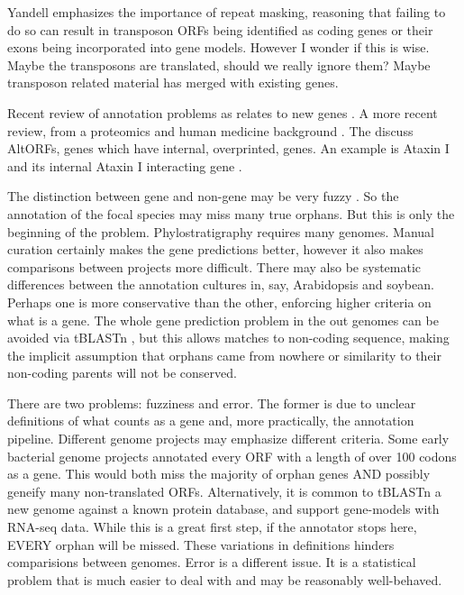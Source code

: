   Yandell emphasizes the importance of repeat masking, reasoning that failing
  to do so can result in transposon ORFs being identified as coding genes or
  their exons being incorporated into gene models. However I wonder if this is
  wise. Maybe the transposons are translated, should we really ignore them?
  Maybe transposon related material has merged with existing genes.

  Recent review of annotation problems as relates to new genes
  \cite{zhang_new_2012}. A more recent review, from a proteomics and human
  medicine background \cite{landry_found_2015}. The discuss AltORFs, genes which
  have internal, overprinted, genes. An example is Ataxin I and its internal
  Ataxin I interacting gene \cite{bergeron_out--frame_2013}.

  The distinction between gene and non-gene may be very fuzzy
  \cite{carvunis_proto-genes_2012}. So the annotation of the focal species
  may miss many true orphans. But this is only the beginning of the problem.
  Phylostratigraphy requires many genomes. Manual curation certainly makes
  the gene predictions better, however it also makes comparisons between
  projects more difficult. There may also be systematic differences between
  the annotation cultures in, say, Arabidopsis and soybean. Perhaps one is
  more conservative than the other, enforcing higher criteria on what is a
  gene. The whole gene prediction problem in the out genomes can be avoided
  via tBLASTn \cite{yang_genome-wide_2013}, but this allows matches to
  non-coding sequence, making the implicit assumption that orphans came from
  nowhere or similarity to their non-coding parents will not be conserved.

  There are two problems: fuzziness and error. The former is due to unclear
  definitions of what counts as a gene and, more practically, the annotation
  pipeline. Different genome projects may emphasize different criteria. Some
  early bacterial genome projects annotated every ORF with a length of over
  100 codons as a gene. This would both miss the majority of orphan genes AND
  possibly geneify many non-translated ORFs. Alternatively, it is common to
  tBLASTn a new genome against a known protein database, and support
  gene-models with RNA-seq data. While this is a great first step, if the
  annotator stops here, EVERY orphan will be missed. These variations in
  definitions hinders comparisions between genomes. Error is a different
  issue. It is a statistical problem that is much easier to deal with and may
  be reasonably well-behaved.

